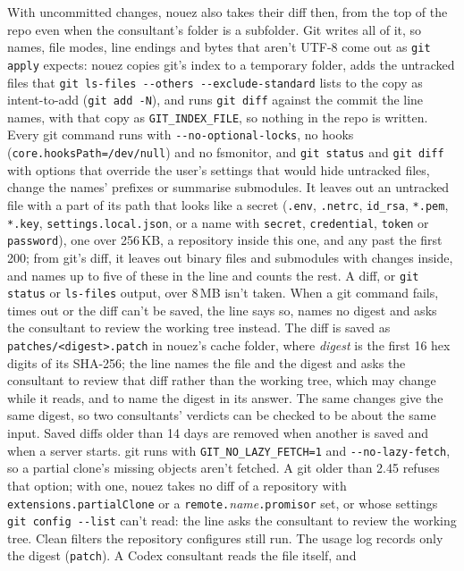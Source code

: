 \documentclass[10pt,a4paper]{article}
\newcommand{\code}[1]{\texttt{#1}}
\begin{document}
With uncommitted changes, nouez also takes their diff then, from the top of the repo even when the
consultant's folder is a subfolder. Git writes all of it, so names, file modes, line endings and
bytes that aren't UTF-8 come out as \code{git apply} expects: nouez copies git's index to a temporary
folder, adds the untracked files that \code{git ls-files -{}-others -{}-exclude-standard} lists to
the copy as intent-to-add (\code{git add -N}), and runs \code{git diff} against the commit the line
names, with that copy as \code{GIT\_INDEX\_FILE}, so nothing in the repo is written. Every git
command runs with \code{-{}-no-optional-locks}, no hooks (\code{core.hooksPath=/dev/null}) and no
fsmonitor, and \code{git status} and \code{git diff} with options that override the user's settings
that would hide untracked files, change the names' prefixes or summarise submodules. It leaves out an untracked file with a part
of its path that looks like a secret (\code{.env}, \code{.netrc}, \code{id\_rsa}, \code{*.pem},
\code{*.key}, \code{settings.local.json}, or a name with \code{secret}, \code{credential},
\code{token} or \code{password}), one over 256\,KB, a repository inside this one, and any past the
first 200; from git's diff, it leaves out binary files and submodules with changes inside, and
names up to five of these in the line and counts the rest. A diff, or \code{git status} or
\code{ls-files} output, over 8\,MB isn't taken. When a git command fails,
times out or the diff can't be saved, the line says so, names no digest and asks the consultant
to review the working tree instead. The diff is saved as
\code{patches/<digest>.patch} in nouez's cache folder, where \textit{digest} is the first 16 hex
digits of its SHA-256; the line names the file and the digest and asks the consultant to review
that diff rather than the working tree, which may change while it reads, and to name the digest
in its answer. The same changes give the same digest, so two consultants' verdicts can be checked
to be about the same input. Saved diffs older than 14 days are removed when another is saved and when a server starts.
git runs with \code{GIT\_NO\_LAZY\_FETCH=1} and \code{-{}-no-lazy-fetch}, so a partial clone's
missing objects aren't fetched. A git older than 2.45 refuses that option; with one, nouez takes no
diff of a repository with \code{extensions.partialClone} or a \code{remote.}\textit{name}\code{.promisor}
set, or whose settings \code{git config -{}-list} can't read: the line asks the consultant to review
the working tree. Clean filters the repository configures still run. The
usage log records only the digest (\code{patch}). A Codex consultant reads the file itself, and
\end{document}
